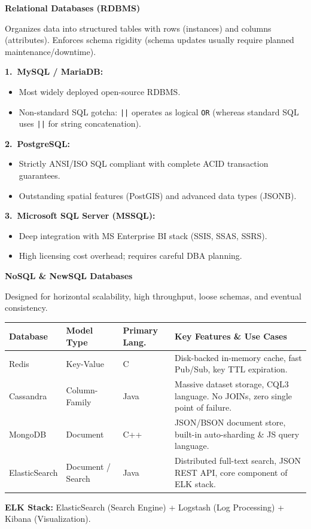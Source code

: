 ﻿\documentclass[8pt, a4paper]{article}
\begin{document}
\begin{conceptbox}
\textbf{Relational Databases (RDBMS)}

Organizes data into structured tables with rows (instances) and columns (attributes). Enforces schema rigidity (schema updates usually require planned maintenance/downtime).

\medskip
\textbf{1.\ MySQL / MariaDB:}
\begin{itemize}
  \item Most widely deployed open-source RDBMS.
  \item Non-standard SQL gotcha: \texttt{||} operates as logical \texttt{OR} (whereas standard SQL uses \texttt{||} for string concatenation).
\end{itemize}

\textbf{2.\ PostgreSQL:}
\begin{itemize}
  \item Strictly ANSI/ISO SQL compliant with complete ACID transaction guarantees.
  \item Outstanding spatial features (PostGIS) and advanced data types (JSONB).
\end{itemize}

\textbf{3.\ Microsoft SQL Server (MSSQL):}
\begin{itemize}
  \item Deep integration with MS Enterprise BI stack (SSIS, SSAS, SSRS).
  \item High licensing cost overhead; requires careful DBA planning.
\end{itemize}
\end{conceptbox}

\begin{conceptbox}
\textbf{NoSQL \& NewSQL Databases}

Designed for horizontal scalability, high throughput, loose schemas, and eventual consistency.

\smallskip
\begin{tabularx}{\linewidth}{l l l X}
  \toprule
  \textbf{Database} & \textbf{Model Type} & \textbf{Primary Lang.} & \textbf{Key Features \& Use Cases} \\
  \midrule
  Redis         & Key-Value         & C    & Disk-backed in-memory cache, fast Pub/Sub, key TTL expiration. \\
  Cassandra     & Column-Family     & Java & Massive dataset storage, CQL3 language. No JOINs, zero single point of failure. \\
  MongoDB       & Document          & C++  & JSON/BSON document store, built-in auto-sharding \& JS query language. \\
  ElasticSearch & Document / Search & Java & Distributed full-text search, JSON REST API, core component of ELK stack. \\
  \bottomrule
\end{tabularx}

\smallskip
\textbf{ELK Stack:} ElasticSearch (Search Engine) + Logstash (Log Processing) + Kibana (Visualization).
\end{conceptbox}
\end{document}
